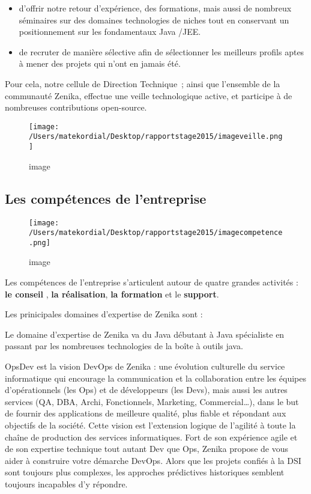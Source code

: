 \begin{itemize}
\item d’offrir notre retour d’expérience, des formations, mais aussi de nombreux séminaires sur des domaines technologies de niches tout en conservant un positionnement sur les fondamentaux Java \slash JEE.

\item de recruter de manière sélective afin de sélectionner les meilleurs profils aptes à mener des projets qui n’ont en jamais été.

\end{itemize}

Pour cela, notre cellule de Direction Technique ; ainsi que l’ensemble de la communauté Zenika, effectue une veille technologique active, et participe à de nombreuses contributions open-source.

\begin{figure}[htbp]
\centering
\texttt{[image: /Users/matekordial/Desktop/rapportstage2015/imageveille.png]}
\caption{image}
\end{figure}

\subsection{Les compétences de l'entreprise}
\label{lescomptencesdelentreprise}

\begin{figure}[htbp]
\centering
\texttt{[image: /Users/matekordial/Desktop/rapportstage2015/imagecompetence.png]}
\caption{image}
\end{figure}

Les compétences de l'entreprise s'articulent autour de quatre grandes activités : \textbf{le conseil} , \textbf{la réalisation}, \textbf{la formation} et le \textbf{support}.

Les prinicipales domaines d'expertise de Zenika sont :

Le domaine d’expertise de Zenika va du Java débutant à Java spécialiste en passant par les nombreuses technologies de la boîte à outils java.



 

OpsDev est la vision DevOps de Zenika : une évolution culturelle du service informatique qui encourage la communication et la collaboration entre les équipes d’opérationnels (les Ops) et de développeurs
(les Devs), mais aussi les autres services (QA, DBA, Archi, Fonctionnels, Marketing, Commercial{\ldots}), dans le but de fournir des applications de meilleure qualité, plus fiable et répondant aux objectifs de la société.
Cette vision est l’extension logique de l’agilité à toute la chaîne de production des services informatiques.
Fort de son expérience agile et de son expertise technique tout autant Dev que Ops, Zenika propose de vous aider à construire votre démarche DevOps. 
 Alors que les projets confiés à la DSI sont toujours plus complexes, les approches prédictives historiques semblent toujours incapables d'y répondre.

